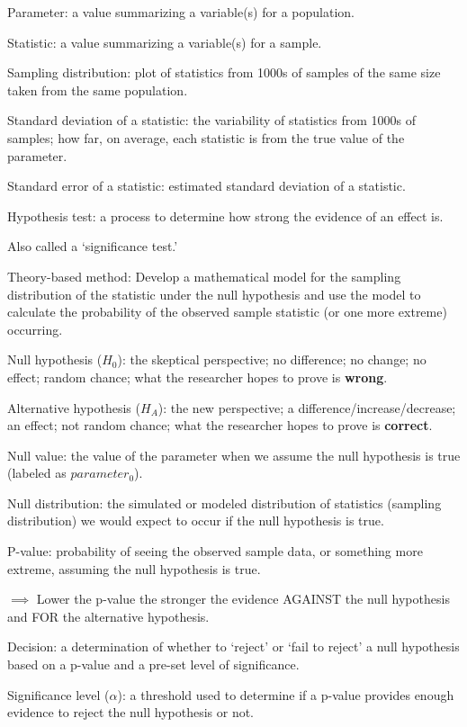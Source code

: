 \documentclass[
]{report}
\newcommand{\rgi}{\hspace{24pt}}  %
\begin{document}
Parameter: a value summarizing a variable(s) for a population.

Statistic: a value summarizing a variable(s) for a sample.

Sampling distribution: plot of statistics from 1000s of samples of the same size taken from the same population.

Standard deviation of a statistic: the variability of statistics from 1000s of samples; how far, on average, each statistic is from the true value of the parameter.

Standard error of a statistic: estimated standard deviation of a statistic.

Hypothesis test: a process to determine how strong the evidence of an effect is.

\rgi Also called a `significance test.'

Theory-based method: Develop a mathematical model for the sampling distribution of the statistic under the null hypothesis and use the model to calculate the probability of the observed sample statistic (or one more extreme) occurring.

Null hypothesis (\(H_0\)): the skeptical perspective; no difference; no change; no effect; random chance; what the researcher hopes to prove is \textbf{wrong}.

Alternative hypothesis (\(H_A\)): the new perspective; a difference/increase/decrease; an effect; not random chance; what the researcher hopes to prove is \textbf{correct}.

Null value: the value of the parameter when we assume the null hypothesis is true (labeled as \(parameter_0\)).

Null distribution: the simulated or modeled distribution of statistics (sampling distribution) we would expect to occur if the null hypothesis is true.

P-value: probability of seeing the observed sample data, or something more extreme, assuming the null hypothesis is true.

\(\implies\) Lower the p-value the stronger the evidence AGAINST the null hypothesis and FOR the alternative hypothesis.

Decision: a determination of whether to `reject' or `fail to reject' a null hypothesis based on a p-value and a pre-set level of significance.

Significance level (\(\alpha\)): a threshold used to determine if a p-value provides enough evidence to reject the null hypothesis or not.
\end{document}
